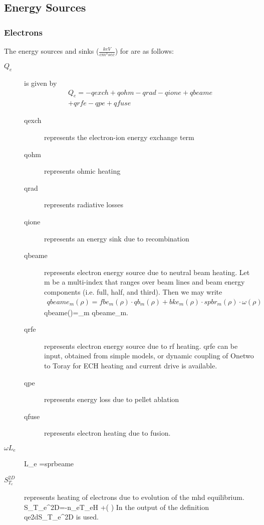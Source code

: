 \subsection{Energy Sources}

\subsubsection{Electrons}

The energy sources and sinks ($\frac{keV}{cm^3sec} $) for  
are as follows:
\begin{description}
 \item[$Q_e$] is given by
 \begin{multline}
  Q_e= -qexch + qohm -qrad-qione+qbeame \\
  +qrfe-qpe+qfuse
 \end{multline}
 \begin{description} %
  \item [qexch] represents the electron-ion energy exchange term
  \item [qohm] represents ohmic heating
  \item [qrad] represents radiative losses
  \item [qione] represents an energy sink due to recombination
  \item [qbeame] represents electron energy source due to neutral beam heating.
  Let m be a multi-index that ranges over beam lines and beam energy components
  (i.e. full, half, and third). Then we may write
  \begin{multline}
   qbeame_m(\rho)=fbe_m(\rho)\cdot qb_m(\rho)+bke_m(\rho)\cdot
   spbr_m(\rho)\cdot\omega(\rho) \label{eq:qbeamem}
  \end{multline}
  \beq
   qbeame(\rho)=\sum_m qbeame_m.
  \eeq
  \item [qrfe] represents electron energy source due to rf heating. qrfe can be
  input, obtained from simple models, or dynamic coupling of Onetwo to Toray for
  ECH heating and current drive is available.
  \item [qpe] represents energy loss due to pellet ablation
  \item [qfuse] represents electron heating due to fusion.
 \end{description}  %
 \item[$\omega L_e $]
 \beq
  \omega L_e =\omega * sprbeame
 \eeq 
 \item [$S_{T_e}^{2D}$] represents heating of electrons due to evolution of the
 mhd equilibrium.
 \beq
  S_{T_e}^{2D}=-n_eT_e\ln H 
  +\left ( \right )
   \bigg [ \frac{5}{2}n_eT_e \pdiff {\ln H} {\rho} \\
    +\frac{3}{2}T_e\sum_{i=1}^{nion}Z_I\pdiff{n_i}{\rho} 
    +\frac{3}{2} \left (n_e+T_e\sum_{i=1}^{nion} n_z\pdiff{Z_i}{T_e}
    \right )\pdiff{T_e}{\rho} \bigg]
 \eeq
 In the output of \ot the definition
 \beq
  qe2d\equiv S_{T_e}^{2D}
 \eeq
 is used.
\end{description}    


